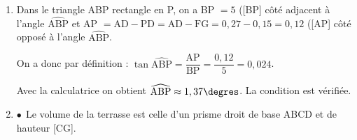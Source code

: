 \begin{enumerate}
	\item %
	
Dans le triangle ABP rectangle en P, on a BP $ = 5$ ([BP] côté adjacent à l'angle $\widehat{\text{ABP}}$ et AP $ = \text{AD} - \text{PD} = \text{AD} - \text{FG} = 0,27 - 0,15 = 0,12$ ([AP] côté opposé à l'angle $\widehat{\text{ABP}}$.

On a donc par définition : $\tan \widehat{\text{ABP}} =  \dfrac{\text{AP}}{\text{BP}} = \dfrac{0,12}{5} = 0,024$.

Avec la calculatrice on obtient $\widehat{\text{ABP}} \approx 1,37\degres$. La condition est vérifiée.	
	\item %
	
	
\smallskip
	
%	
%	
$\bullet~~$Le volume de la terrasse est celle d'un prisme droit de base ABCD et de hauteur [CG].


\end{enumerate}
